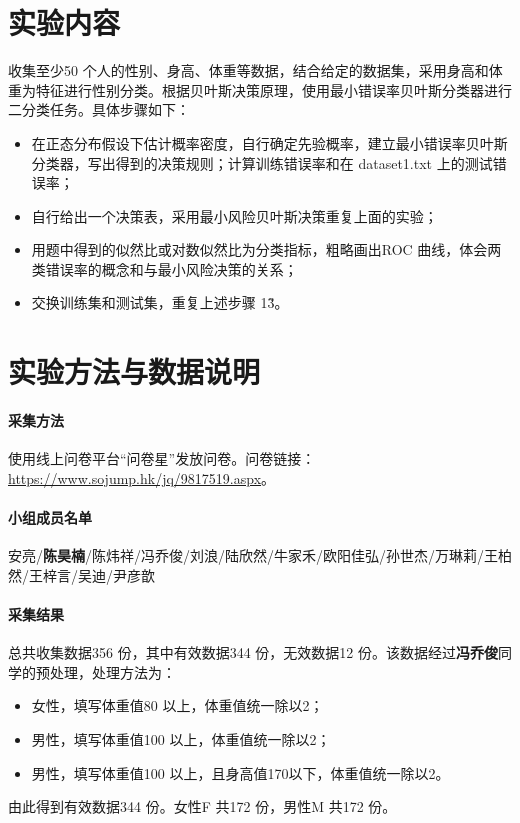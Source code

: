 \tableofcontents
\clearpage


\section{实验内容}
收集至少50 个人的性别、身高、体重等数据，结合给定的数据集，采用身高和体重为特征进行性别分类。根据贝叶斯决策原理，使用最小错误率贝叶斯分类器进行二分类任务。具体步骤如下：

\begin{itemize}
	\item 在正态分布假设下估计概率密度，自行确定先验概率，建立最小错误率贝叶斯分类器，写出得到的决策规则；计算训练错误率和在 dataset1.txt 上的测试错误率；
	\item 自行给出一个决策表，采用最小风险贝叶斯决策重复上面的实验；
	\item 用题中得到的似然比或对数似然比为分类指标，粗略画出ROC 曲线，体会两类错误率的概念和与最小风险决策的关系；
	\item 交换训练集和测试集，重复上述步骤 1\~3。
\end{itemize}

\section{实验方法与数据说明}
	\paragraph{采集方法} 使用线上问卷平台“问卷星”发放问卷。问卷链接：\url{https://www.sojump.hk/jq/9817519.aspx}。
	\paragraph{小组成员名单} 安亮/\textbf{陈昊楠}/陈炜祥/冯乔俊/刘浪/陆欣然/牛家禾/欧阳佳弘/孙世杰/万琳莉/王柏然/王梓言/吴迪/尹彦歆
	\paragraph{采集结果} 总共收集数据356 份，其中有效数据344 份，无效数据12 份。该数据经过\textbf{冯乔俊}同学的预处理，处理方法为：
	\begin{itemize}
		\item 女性，填写体重值80 以上，体重值统一除以2；
		\item 男性，填写体重值100 以上，体重值统一除以2；
		\item 男性，填写体重值100 以上，且身高值170以下，体重值统一除以2。
	\end{itemize}
	由此得到有效数据344 份。女性F 共172 份，男性M 共172 份。
